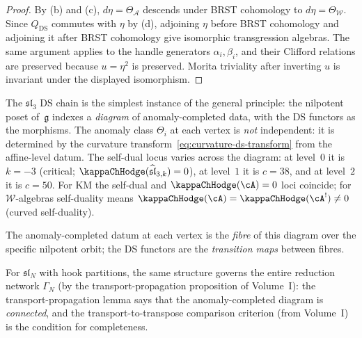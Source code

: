 \begin{proof}
By (b) and (c), \(d\eta=\Theta_{\mathcal A}\) descends under BRST
cohomology to \(d\eta=\Theta_{\mathcal W}\).  Since \(Q_{\mathrm{DS}}\)
commutes with \(\eta\) by (d), adjoining \(\eta\) before BRST
cohomology and adjoining it after BRST cohomology give isomorphic
transgression algebras.  The same argument applies to the handle
generators \(\alpha_i,\beta_i\), and their Clifford relations are
preserved because \(u=\eta^2\) is preserved.  Morita triviality after
inverting \(u\) is invariant under the displayed isomorphism.
\end{proof}

\begin{remark}
\label{rem:sl3-platonic-model}
The $\mathfrak{sl}_3$ DS chain is the simplest instance of
the general principle: the nilpotent poset of~$\mathfrak g$
indexes a \emph{diagram} of anomaly-completed data, with the
DS functors as the morphisms. The anomaly class $\Theta_i$ at
each vertex is \emph{not} independent: it is determined by the
curvature transform~\eqref{eq:curvature-ds-transform} from
the affine-level datum. The self-dual locus
varies across the diagram: at level~$0$ it is $k=-3$
(critical; $\kappaChHodge(\widehat{\mathfrak{sl}}_{3,k})=0$), at level~$1$ it is $c=38$,
and at level~$2$ it is $c=50$.
For KM the self-dual and $\kappaChHodge(\cA)=0$ loci coincide;
for $\mathcal{W}$-algebras self-duality means
$\kappaChHodge(\cA) = \kappaChHodge(\cA^!) \ne 0$ (curved self-duality).

The anomaly-completed datum at each vertex is
the \emph{fibre} of this diagram over the specific nilpotent
orbit; the DS functors are the \emph{transition maps} between
fibres.

For $\mathfrak{sl}_N$ with hook partitions, the same
structure governs the entire reduction network $\Gamma_N$
\textup{(}by the transport-propagation proposition of Volume~I\textup{)}:
the transport-propagation lemma says that the
anomaly-completed diagram is \emph{connected}, and the
transport-to-transpose comparison criterion
\textup{(}from Volume~I\textup{)}
is the condition for completeness.
\end{remark}

